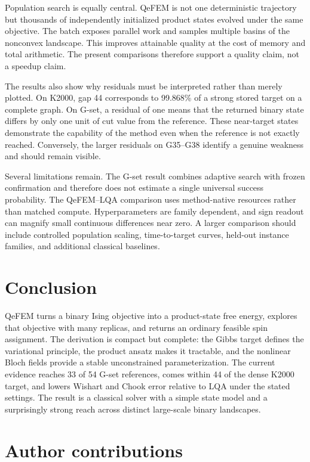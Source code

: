 \documentclass[
  aps,
  prx,
  reprint,
  amsmath,
  amssymb,
  groupedaddress,
  nofootinbib,
  floatfix,
  longbibliography
]{revtex4-2}
\newcommand{\qefem}{QeFEM}
\newcommand{\lqa}{\textsc{LQA}}
\begin{document}
Population search is equally central.  \qefem{} is not one deterministic
trajectory but thousands of independently initialized product states evolved
under the same objective.  The batch exposes parallel work and samples
multiple basins of the nonconvex landscape.  This improves attainable quality
at the cost of memory and total arithmetic.  The present comparisons therefore
support a quality claim, not a speedup claim.

The results also show why residuals must be interpreted rather than merely
plotted.  On K2000, gap 44 corresponds to 99.868\% of a strong stored target
on a complete graph.  On G-set, a residual of one means that the returned
binary state differs by only one unit of cut value from the reference.  These
near-target states demonstrate the capability of the method even when the
reference is not exactly reached.  Conversely, the larger residuals on
G35--G38 identify a genuine weakness and should remain visible.

Several limitations remain.  The G-set result combines adaptive search with
frozen confirmation and therefore does not estimate a single universal
success probability.  The \qefem{}--\lqa{} comparison uses method-native
resources rather than matched compute.  Hyperparameters are family dependent,
and sign readout can magnify small continuous differences near zero.  A larger
comparison should include controlled population scaling, time-to-target
curves, held-out instance families, and additional classical baselines.

\section{Conclusion}

\qefem{} turns a binary Ising objective into a product-state free energy,
explores that objective with many replicas, and returns an ordinary feasible
spin assignment.  The derivation is compact but complete: the Gibbs target
defines the variational principle, the product ansatz makes it tractable, and
the nonlinear Bloch fields provide a stable unconstrained parameterization.
The current evidence reaches 33 of 54 G-set references, comes within 44 of the
dense K2000 target, and lowers Wishart and Chook error relative to \lqa{} under
the stated settings.  The result is a classical solver with a simple state
model and a surprisingly strong reach across distinct large-scale binary
landscapes.

\section*{Author contributions}
\end{document}
